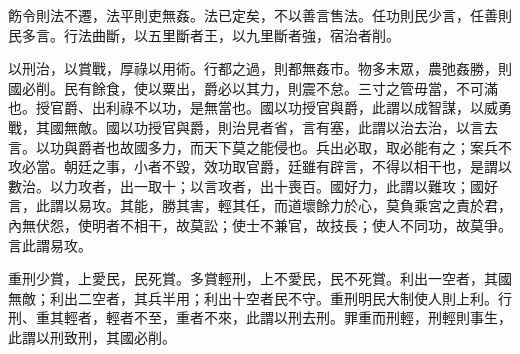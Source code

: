
\begin{pinyinscope}
飭令則法不遷，法平則吏無姦。法已定矣，不以善言售法。任功則民少言，任善則民多言。行法曲斷，以五里斷者王，以九里斷者強，宿治者削。

以刑治，以賞戰，厚祿以用術。行都之過，則都無姦市。物多末眾，農弛姦勝，則國必削。民有餘食，使以粟出，爵必以其力，則震不怠。三寸之管毋當，不可滿也。授官爵、出利祿不以功，是無當也。國以功授官與爵，此謂以成智謀，以威勇戰，其國無敵。國以功授官與爵，則治見者省，言有塞，此謂以治去治，以言去言。以功與爵者也故國多力，而天下莫之能侵也。兵出必取，取必能有之；案兵不攻必當。朝廷之事，小者不毀，效功取官爵，廷雖有辟言，不得以相干也，是謂以數治。以力攻者，出一取十；以言攻者，出十喪百。國好力，此謂以難攻；國好言，此謂以易攻。其能，勝其害，輕其任，而道壞餘力於心，莫負乘宮之責於君，內無伏怨，使明者不相干，故莫訟；使士不兼官，故技長；使人不同功，故莫爭。言此謂易攻。

重刑少賞，上愛民，民死賞。多賞輕刑，上不愛民，民不死賞。利出一空者，其國無敵；利出二空者，其兵半用；利出十空者民不守。重刑明民大制使人則上利。行刑、重其輕者，輕者不至，重者不來，此謂以刑去刑。罪重而刑輕，刑輕則事生，此謂以刑致刑，其國必削。


\end{pinyinscope}